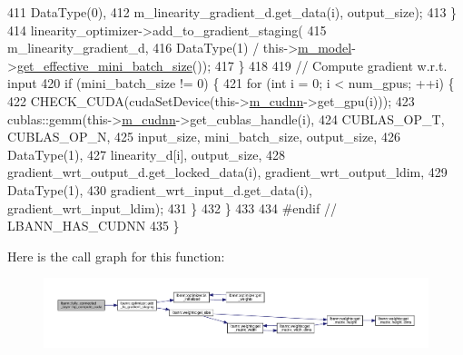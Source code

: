 \begin{DoxyCode}
411                      DataType(0),
412                      m\_linearity\_gradient\_d.get\_data(i), output\_size);
413       \}
414       linearity\_optimizer->add\_to\_gradient\_staging(
415         m\_linearity\_gradient\_d,
416         DataType(1) / this->\hyperlink{classlbann_1_1Layer_a3d9315e99574166f2f33e37b572021d2}{m\_model}->\hyperlink{classlbann_1_1model_a2a9b4cfa1c8c91e4131908751f9c4a6a}{get\_effective\_mini\_batch\_size}());
417     \}
418 
419     \textcolor{comment}{// Compute gradient w.r.t. input}
420     \textcolor{keywordflow}{if} (mini\_batch\_size != 0) \{
421       \textcolor{keywordflow}{for} (\textcolor{keywordtype}{int} i = 0; i < num\_gpus; ++i) \{
422         CHECK\_CUDA(cudaSetDevice(this->\hyperlink{classlbann_1_1Layer_a08dbb94239e3b8c96329786c57c72e21}{m\_cudnn}->get\_gpu(i)));
423         cublas::gemm(this->\hyperlink{classlbann_1_1Layer_a08dbb94239e3b8c96329786c57c72e21}{m\_cudnn}->get\_cublas\_handle(i),
424                      CUBLAS\_OP\_T, CUBLAS\_OP\_N,
425                      input\_size, mini\_batch\_size, output\_size,
426                      DataType(1),
427                      linearity\_d[i], output\_size,
428                      gradient\_wrt\_output\_d.get\_locked\_data(i), gradient\_wrt\_output\_ldim,
429                      DataType(1),
430                      gradient\_wrt\_input\_d.get\_data(i), gradient\_wrt\_input\_ldim);
431       \}
432     \}
433 
434 \textcolor{preprocessor}{#endif // LBANN\_HAS\_CUDNN}
435   \}
\end{DoxyCode}
Here is the call graph for this function\+:\nopagebreak
\begin{figure}[H]
\begin{center}
\leavevmode
\includegraphics[width=350pt]{classlbann_1_1fully__connected__layer_a521aa4a5b88ef00f554fe21a850f6596_cgraph}
\end{center}
\end{figure}
\mbox{\label{classlbann_1_1fully__connected__layer_a7e838b85cb7bf075def5a88fba2ace20}} 

